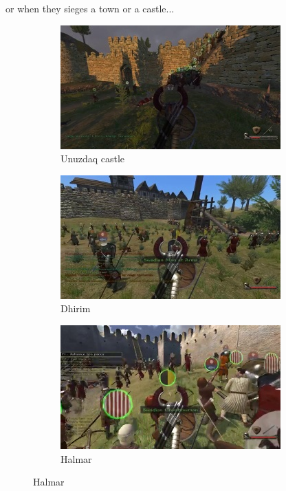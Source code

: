 \documentclass[
]{article}
\begin{document}
or when they sieges a town or a castle...

\begin{figure}
	\centering
	\begin{subfigure}[b]{0.3\textwidth}
		\includegraphics[width=\linewidth]{docimages/E_0068_00_48_04.jpg}
		\caption{Unuzdaq castle}
	\end{subfigure}
	\begin{subfigure}[b]{0.3\textwidth}
		\includegraphics[width=\linewidth]{docimages/E_0068_00_20_08.jpg}
		\caption{Dhirim}
	\end{subfigure}
	\begin{subfigure}[b]{0.3\textwidth}
		\includegraphics[width=\linewidth]{docimages/E_0075_00_25_50.jpg}
		\caption{Halmar}
	\end{subfigure}
\end{figure}
\end{document}
